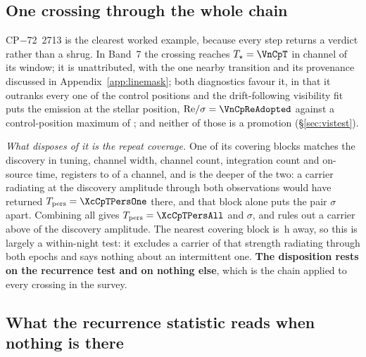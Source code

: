\subsection{One crossing through the whole chain}

CP$-$72~2713 is the clearest worked example, because every step returns a
verdict rather than a shrug. In Band~7 the crossing reaches
$T_\star=\VnCpT$ in channel \VnCpChan{} of its window; it is unattributed,
with the one nearby transition and its provenance discussed in
Appendix~\ref{app:linemask}; both diagnostics favour it, in that it outranks
every one of the \NCtrl{} control positions and the drift-following
visibility fit puts the emission at the stellar position, ${\rm
Re}/\sigma=\VnCpReAdopted$ against a control-position maximum of
\VnCpCtrlAdopted; and neither of those is a promotion
(\S\ref{sec:vistest}).

\emph{What disposes of it is the repeat coverage.} One of its
\XcCpNRep{} covering blocks matches the discovery in tuning, channel width,
channel count, integration count and on-source time, registers to
\CpRecOffChan{} of a channel, and is the deeper of the two: a carrier
radiating at the discovery amplitude through both observations would have
returned $T_{\rm pers}=\XcCpTPersOne$ there, and that block alone puts the
pair \XcCpExclOne$\sigma$ apart. Combining all \XcCpNRep{} gives
$T_{\rm pers}=\XcCpTPersAll$ and \XcCpExcl$\sigma$, and rules out a carrier
above \XcCpFrac{} of the discovery amplitude. The nearest covering block is
\XcCpSepH\,h away, so this is largely a within-night test: it excludes a
carrier of that strength radiating through both epochs and says nothing about
an intermittent one. \textbf{The disposition rests on the recurrence test and
on nothing else}, which is the chain applied to every crossing in the survey.

\subsection{What the recurrence statistic reads when nothing is there}

